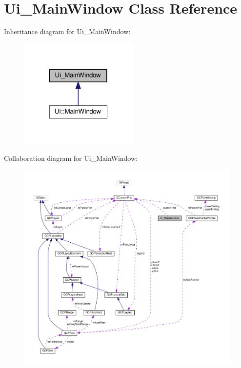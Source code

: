 \hypertarget{classUi__MainWindow}{}\section{Ui\+\_\+\+Main\+Window Class Reference}
\label{classUi__MainWindow}


Inheritance diagram for Ui\+\_\+\+Main\+Window\+:\nopagebreak
\begin{figure}[H]
\begin{center}
\leavevmode
\includegraphics[width=169pt]{classUi__MainWindow__inherit__graph}
\end{center}
\end{figure}


Collaboration diagram for Ui\+\_\+\+Main\+Window\+:\nopagebreak
\begin{figure}[H]
\begin{center}
\leavevmode
\includegraphics[width=350pt]{classUi__MainWindow__coll__graph}
\end{center}
\end{figure}
